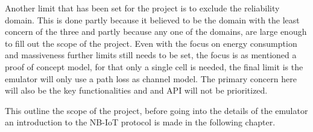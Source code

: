 Another limit that has been set for the project is to exclude the reliability domain. This is done partly because it believed to be the domain with the least concern of the three and partly because any one of the domains, are large enough to fill out the scope of the project. Even with the focus on energy consumption and massiveness further limits still needs to be set, the focus is as mentioned a proof of concept model, for that only a single cell is needed, the final limit is the emulator will only use a path loss as channel model. The primary concern here will also be the key functionalities and and API will not be prioritized.

This outline the scope of the project, before going into the details of the emulator an introduction to the \gls{NB-IoT} protocol is made in the following chapter.









 


